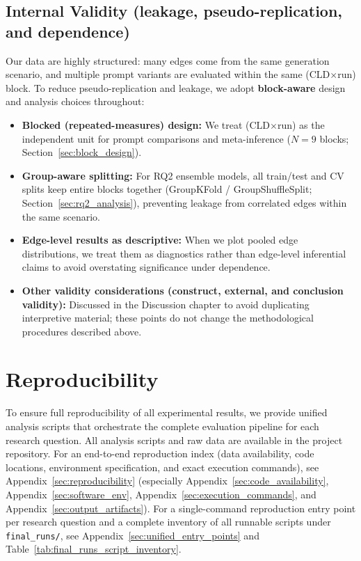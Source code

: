 \subsection{Internal Validity (leakage, pseudo-replication, and dependence)}
Our data are highly structured: many edges come from the same generation scenario, and multiple prompt variants are evaluated within the same (CLD$\times$run) block. To reduce pseudo-replication and leakage, we adopt \textbf{block-aware} design and analysis choices throughout:
\begin{itemize}[noitemsep]
    \item \textbf{Blocked (repeated-measures) design:} We treat (CLD$\times$run) as the independent unit for prompt comparisons and meta-inference ($N=9$ blocks; Section~\ref{sec:block_design}).
    \item \textbf{Group-aware splitting:} For RQ2 ensemble models, all train/test and CV splits keep entire blocks together (GroupKFold / GroupShuffleSplit; Section~\ref{sec:rq2_analysis}), preventing leakage from correlated edges within the same scenario.
    \item \textbf{Edge-level results as descriptive:} When we plot pooled edge distributions, we treat them as diagnostics rather than edge-level inferential claims to avoid overstating significance under dependence.
\end{itemize}

\begin{itemize}[noitemsep]
    \item \textbf{Other validity considerations (construct, external, and conclusion validity):} Discussed in the Discussion chapter to avoid duplicating interpretive material; these points do not change the methodological procedures described above.
\end{itemize}

\section{Reproducibility}
\label{sec:reproduction}

To ensure full reproducibility of all experimental results, we provide unified analysis scripts that orchestrate the complete evaluation pipeline for each research question. All analysis scripts and raw data are available in the project repository.
For an end-to-end reproduction index (data availability, code locations, environment specification, and exact execution commands), see Appendix~\ref{sec:reproducibility} (especially Appendix~\ref{sec:code_availability}, Appendix~\ref{sec:software_env}, Appendix~\ref{sec:execution_commands}, and Appendix~\ref{sec:output_artifacts}).
For a single-command reproduction entry point per research question and a complete inventory of all runnable scripts under \texttt{final\_runs/}, see Appendix~\ref{sec:unified_entry_points} and Table~\ref{tab:final_runs_script_inventory}.

